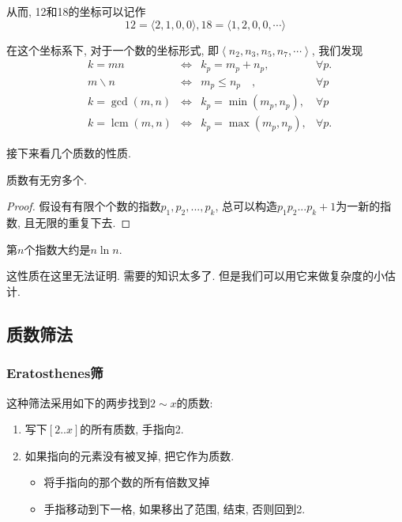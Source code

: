 \documentclass{ctexart}
\begin{document}
从而, 12和18的坐标可以记作
$$
12=\langle 2,1,0,0\rangle, 18=\langle 1,2,0,0, \cdots\rangle
$$

在这个坐标系下, 对于一个数的坐标形式, 即$\left\langle n_2, n_3, n_5, n_7, \cdots\right\rangle$, 我们发现
$$\begin{aligned} & k=m n &\Leftrightarrow& k_p=m_p+n_p, &\forall p . \\ & m \backslash n & \Leftrightarrow& m_p\leq n_p\quad, &\forall p \\ & k=\operatorname{gcd}(m, n) &\Leftrightarrow& k_p=\min \left(m_p, n_p\right), &\forall p \\ & k=\operatorname{lcm}(m, n) &\Leftrightarrow& k_p=\max \left(m_p, n_p\right), &\forall p .\end{aligned}$$

接下来看几个质数的性质. 

\begin{prop}
    质数有无穷多个. 
\end{prop}

\begin{proof}
    假设有有限个个数的指数$p_1, p_2, ..., p_k$, 总可以构造$p_1p_2...p_k+1$为一新的指数, 且无限的重复下去. 
\end{proof}

\begin{prop}
    第$n$个指数大约是$n\ln n$. 
    
\end{prop}
这性质在这里无法证明. 需要的知识太多了. 但是我们可以用它来做复杂度的小估计. 


\subsection{质数筛法}

\subsubsection{Eratosthenes筛}

这种筛法采用如下的两步找到$2\sim x$的质数:
\begin{enumerate}
    \item 写下$[2..x]$的所有质数, 手指向2. 
    \item 如果指向的元素没有被叉掉, 把它作为质数.
        \begin{itemize}
            \item 将手指向的那个数的所有倍数叉掉
            \item 手指移动到下一格, 如果移出了范围, 结束, 否则回到2.
        \end{itemize}
\end{enumerate}
\end{document}
